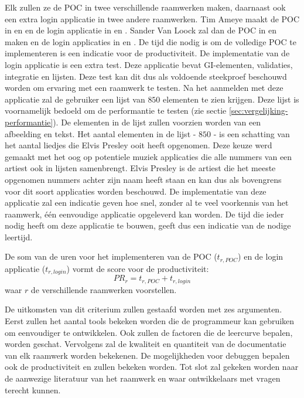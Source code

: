Elk zullen ze de POC in twee verschillende raamwerken maken,  daarnaast ook een extra login applicatie in twee andere raamwerken.
Tim Ameye maakt de POC in \jqm{} en \lungo{} en de login applicatie in \st{} en \kendo{}.
Sander Van Loock zal dan de POC in \st{} en \kendo{} maken en de login applicaties in \jqm{} en \lungo{}.
De tijd die nodig is om de volledige POC te implementeren is een indicatie voor de productiviteit. 
De implementatie van de login applicatie is een extra test.
Deze applicatie bevat GI-elementen, validaties,   integratie en lijsten.
Deze test kan dit dus als voldoende steekproef beschouwd worden om ervaring met een raamwerk te testen.
Na het aanmelden met deze applicatie zal de gebruiker een lijst van $850$ elementen te zien krijgen.
Deze lijst is voornamelijk bedoeld om de performantie te testen (zie sectie \ref{sec:vergelijking-performantie}).
De elementen in de lijst zullen voorzien worden van een afbeelding en tekst.
Het aantal elementen in de lijst - $850$ - is een schatting van het aantal liedjes die Elvis Presley ooit heeft opgenomen. %
Deze keuze werd gemaakt met het oog op potentiele muziek applicaties die alle nummers van een artiest ook in lijsten samenbrengt.
Elvis Presley is de artiest die het meeste opgenomen nummers achter zijn naam heeft staan en kan dus als bovengrens voor dit soort applicaties worden beschouwd.
De implementatie van deze applicatie zal een indicatie geven hoe snel,  zonder al te veel voorkennis van het raamwerk,  één eenvoudige applicatie opgeleverd kan worden.
De tijd die ieder nodig heeft om deze applicatie te bouwen, geeft dus een indicatie van de nodige leertijd.


De som van de uren voor het implementeren van de POC ($t_{r,POC}$) en de login applicatie ($t_{r,login}$) vormt de score voor de productiviteit:
\begin{equation}
  PR_r = {t_{r,POC} + t_{r,login}}
  \label{eq:productiviteit}
\end{equation}
waar $r$ de verschillende raamwerken voorstellen.

De uitkomsten van dit criterium zullen gestaafd worden met zes argumenten.
Eerst zullen het aantal tools bekeken worden die de programmeur kan gebruiken om eenvoudiger te ontwikkelen.
Ook zullen de factoren die de leercurve bepalen, worden geschat.
Vervolgens zal de kwaliteit en quantiteit van de documentatie van elk raamwerk worden bekekenen.
De mogelijkheden voor debuggen bepalen ook de productiviteit en zullen bekeken worden.
Tot slot zal gekeken worden naar de aanwezige literatuur van het raamwerk en waar ontwikkelaars met vragen terecht kunnen.

